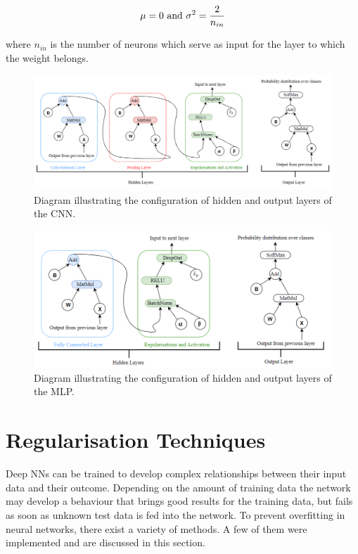 \begin{equation}
  \centering
  \mu = 0 \ \text{and} \ \sigma^2 = \frac{2}{n_{in}}
\end{equation}

where $n_{in}$ is the number of neurons which serve as input for the layer to which the weight belongs. \\

\begin{figure}[H]
  \centering
  \centerline{\includegraphics[scale=0.6]{Images/cnn_layers.png}}
  \caption{Diagram illustrating the configuration of hidden and output layers of the CNN.}
  \label{cnn_layers}
\end{figure}

     \begin{figure}[H]
  \centering
  \centerline{\includegraphics[scale=0.6]{Images/mlp_layers.png}}
  \caption{Diagram illustrating the configuration of hidden and output layers of the MLP.}
  \label{mlp_layers}
    \end{figure}

\section{Regularisation Techniques}

Deep NNs can be trained to develop complex relationships between their input data and their outcome. Depending on the amount of training data the network may develop a behaviour that brings good results for the training data, but fails as soon as unknown test data is fed into the network. To prevent overfitting in neural networks, there exist a variety of methods. A few of them were implemented and are discussed in this section.

